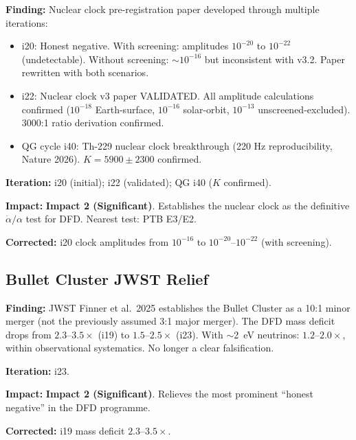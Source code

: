 \documentclass[11pt,a4paper]{article}
\newcommand{\imptwo}{\textcolor{impact2}{\textbf{Impact 2 (Significant)}}}
\begin{document}
\begin{tcolorbox}[colback=green!5!white, colframe=green!50!black,
  title=\textbf{Clock Pre-Registration Paper --- Iterations 20--22}]

\textbf{Finding:} Nuclear clock pre-registration paper developed through
multiple iterations:
\begin{itemize}
  \item i20: Honest negative. With screening: amplitudes $10^{-20}$ to
    $10^{-22}$ (undetectable). Without screening: $\sim 10^{-16}$ but
    inconsistent with v3.2. Paper rewritten with both scenarios.
  \item i22: Nuclear clock v3 paper VALIDATED. All amplitude calculations
    confirmed ($10^{-18}$ Earth-surface, $10^{-16}$ solar-orbit,
    $10^{-13}$ unscreened-excluded). 3000:1 ratio derivation confirmed.
  \item QG cycle i40: Th-229 nuclear clock breakthrough (220 Hz
    reproducibility, Nature 2026). $K = 5900 \pm 2300$ confirmed.
\end{itemize}

\textbf{Iteration:} i20 (initial); i22 (validated); QG i40 ($K$ confirmed).

\textbf{Impact:} \imptwo. Establishes the nuclear clock as the
definitive $\dot\alpha/\alpha$ test for DFD. Nearest test: PTB E3/E2.

\textbf{Corrected:} i20 clock amplitudes from $10^{-16}$ to
$10^{-20}$--$10^{-22}$ (with screening).

\end{tcolorbox}

\subsection{Bullet Cluster JWST Relief}
\label{sec:bullet-cluster}

\begin{tcolorbox}[colback=green!5!white, colframe=green!50!black,
  title=\textbf{Bullet Cluster: JWST 10:1 Minor Merger --- Iteration 23}]

\textbf{Finding:} JWST Finner et al.\ 2025 establishes the Bullet Cluster
as a 10:1 minor merger (not the previously assumed 3:1 major merger).
The DFD mass deficit drops from $2.3$--$3.5\times$ (i19) to
$1.5$--$2.5\times$ (i23). With $\sim$2~eV neutrinos: $1.2$--$2.0\times$,
within observational systematics. No longer a clear falsification.

\textbf{Iteration:} i23.

\textbf{Impact:} \imptwo. Relieves the most prominent ``honest negative''
in the DFD programme.

\textbf{Corrected:} i19 mass deficit $2.3$--$3.5\times$.

\end{tcolorbox}
\end{document}
